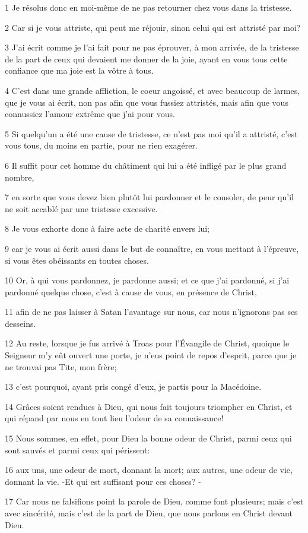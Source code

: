 \par 1 Je résolus donc en moi-même de ne pas retourner chez vous dans la tristesse.
\par 2 Car si je vous attriste, qui peut me réjouir, sinon celui qui est attristé par moi?
\par 3 J'ai écrit comme je l'ai fait pour ne pas éprouver, à mon arrivée, de la tristesse de la part de ceux qui devaient me donner de la joie, ayant en vous tous cette confiance que ma joie est la vôtre à tous.
\par 4 C'est dans une grande affliction, le coeur angoissé, et avec beaucoup de larmes, que je vous ai écrit, non pas afin que vous fussiez attristés, mais afin que vous connussiez l'amour extrême que j'ai pour vous.
\par 5 Si quelqu'un a été une cause de tristesse, ce n'est pas moi qu'il a attristé, c'est vous tous, du moins en partie, pour ne rien exagérer.
\par 6 Il suffit pour cet homme du châtiment qui lui a été infligé par le plus grand nombre,
\par 7 en sorte que vous devez bien plutôt lui pardonner et le consoler, de peur qu'il ne soit accablé par une tristesse excessive.
\par 8 Je vous exhorte donc à faire acte de charité envers lui;
\par 9 car je vous ai écrit aussi dans le but de connaître, en vous mettant à l'épreuve, si vous êtes obéissants en toutes choses.
\par 10 Or, à qui vous pardonnez, je pardonne aussi; et ce que j'ai pardonné, si j'ai pardonné quelque chose, c'est à cause de vous, en présence de Christ,
\par 11 afin de ne pas laisser à Satan l'avantage sur nous, car nous n'ignorons pas ses desseins.
\par 12 Au reste, lorsque je fus arrivé à Troas pour l'Évangile de Christ, quoique le Seigneur m'y eût ouvert une porte, je n'eus point de repos d'esprit, parce que je ne trouvai pas Tite, mon frère;
\par 13 c'est pourquoi, ayant pris congé d'eux, je partis pour la Macédoine.
\par 14 Grâces soient rendues à Dieu, qui nous fait toujours triompher en Christ, et qui répand par nous en tout lieu l'odeur de sa connaissance!
\par 15 Nous sommes, en effet, pour Dieu la bonne odeur de Christ, parmi ceux qui sont sauvés et parmi ceux qui périssent:
\par 16 aux uns, une odeur de mort, donnant la mort; aux autres, une odeur de vie, donnant la vie. -Et qui est suffisant pour ces choses? -
\par 17 Car nous ne falsifions point la parole de Dieu, comme font plusieurs; mais c'est avec sincérité, mais c'est de la part de Dieu, que nous parlons en Christ devant Dieu.

